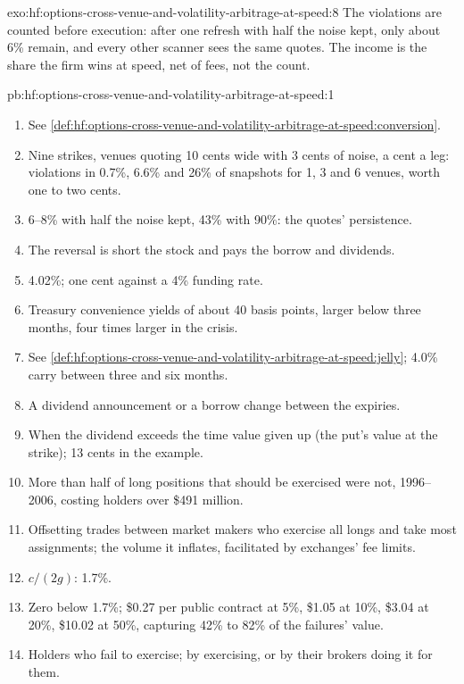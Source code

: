 \begin{solution}{exo:hf:options-cross-venue-and-volatility-arbitrage-at-speed:8}
The violations are counted before execution: after one refresh with half the noise kept, only about 6\% remain, and every other scanner sees the same
quotes. The income is the share the firm wins at speed, net of fees, not the count.
\end{solution}

\begin{solution}{pb:hf:options-cross-venue-and-volatility-arbitrage-at-speed:1}
\begin{enumerate}
\item See \cref{def:hf:options-cross-venue-and-volatility-arbitrage-at-speed:conversion}.
\item Nine strikes, venues quoting 10 cents wide with 3 cents of noise, a cent a leg: violations in 0.7\%, 6.6\% and 26\% of snapshots for 1, 3 and 6
venues, worth one to two cents.
\item 6--8\% with half the noise kept, 43\% with 90\%: the quotes' persistence.
\item The reversal is short the stock and pays the borrow and dividends.
\item 4.02\%; one cent against a 4\% funding rate.
\item Treasury convenience yields of about 40 basis points, larger below three months, four times larger in the crisis.
\item See \cref{def:hf:options-cross-venue-and-volatility-arbitrage-at-speed:jelly}; 4.0\% carry between three and six months.
\item A dividend announcement or a borrow change between the expiries.
\item When the dividend exceeds the time value given up (the put's value at the strike); 13 cents in the example.
\item More than half of long positions that should be exercised were not, 1996--2006, costing holders over \$491 million.
\item Offsetting trades between market makers who exercise all longs and take most assignments; the volume it inflates, facilitated by exchanges'
fee limits.
\item $c/(2g)$: 1.7\%.
\item Zero below 1.7\%; \$0.27 per public contract at 5\%, \$1.05 at 10\%, \$3.04 at 20\%, \$10.02 at 50\%, capturing 42\% to 82\% of the failures'
value.
\item Holders who fail to exercise; by exercising, or by their brokers doing it for them.

\end{enumerate}
\end{solution}
